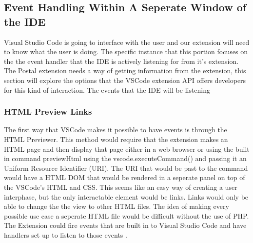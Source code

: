 \documentclass[letterpaper,10pt,titlepage,draftclsnofoot,onecolumn,onesided] {IEEEtran}
\begin{document}
%
\subsection{Event Handling Within A Seperate Window of the IDE}
Visual Studio Code is going to interface with the user and our extension will need to know what the user is doing.
The specific instance that this portion focuses on the the event handler that the IDE is actively listening for from it's extension.
The Postal extension needs a way of getting information from the extension, this section will explore the options that the VSCode extension API offers developers for this kind of interaction. 
The events that the IDE will be listening 
\\
\subsubsection{HTML Preview Links}
The first way that VSCode makes it possible to have events is through the HTML Previewer. \cite{VSCode Documentation} 
This method would require that the extension makes an HTML page and then display that page either in a web browser or using the built in command previewHtml using the vscode.executeCommand() and passing it an Uniform Resource Identifier (URI). 
The URI that would be past to the command would have a HTML DOM that would be rendered in a seperate panel on top of the VSCode's HTML and CSS. 
This seems like an easy way of creating a user interphase, but the only interactable element would be links. 
Links would only be able to change the the view to other HTML files. 
The idea of making every possible use case a seperate HTML file would be difficult without the use of PHP.
The Extension could fire events that are built in to Visual Studio Code and have handlers set up to listen to those events . 
\end{document}
